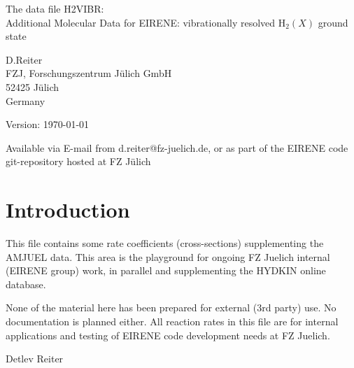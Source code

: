 \documentclass[12pt,dvipdfmx]{article}
\begin{document}
\parindent 0pt
{\LARGE \bf \center
\vspace*{3truecm}

The data file H2VIBR: \\
Additional  Molecular Data for EIRENE: vibrationally resolved H$_2(X)$ ground state
\vspace*{3truecm}

D.Reiter \\
FZJ, Forschungszentrum J\"ulich GmbH \\
52425 J\"ulich \\
Germany
\vspace{3truecm}

Version: \today
\vspace{1truecm}

Available via E-mail from d.reiter@fz-juelich.de, or as part of the
EIRENE code git-repository hosted at FZ J\"ulich
}
\newpage
\renewcommand\thesection{\Roman{section}}
\tableofcontents
\newpage
\section{Introduction}\label{sec-intro}

This file contains some rate coefficients (cross-sections)
supplementing the AMJUEL data. This area is the playground for
ongoing FZ Juelich internal (EIRENE group) work, in parallel and
supplementing the HYDKIN online database.

None of the material here has been prepared for external (3rd party)
use. No documentation is planned either. All reaction rates in this
file are for internal applications and testing of EIRENE code
development needs at FZ Juelich.


Detlev Reiter
\end{document}
